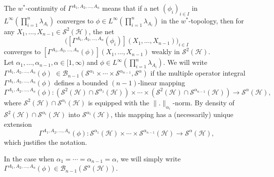 \documentclass[12pt]{amsart}
\theoremstyle{remark}
\begin{document}
The $w^*$-continuity of $\Gamma^{A_1,A_2, \ldots, A_n}$ means that if a net $(\phi_i)_{i\in I}$ in $L^{\infty}\left(\prod_{i=1}^n
\lambda_{A_i}\right)$ converges to $\phi \in L^{\infty}\left(\prod_{i=1}^n \lambda_{A_i}\right)$ in the $w^*$-topology, then for any $X_1, \ldots, X_{n-1} \in \mathcal{S}^2(\mathcal{H})$, the net
$$
\bigl(\left[\Gamma^{A_1,A_2, \ldots, A_n}(\phi_i)\right](X_1,\ldots, X_{n-1})\bigr)_{i\in I}
$$
converges to $\left[\Gamma^{A_1,A_2, \ldots, A_n}(\phi)\right](X_1,\ldots, X_{n-1})$ weakly in $\mathcal{S}^2(\mathcal{H})$.\\

Let $\alpha_1, \ldots, \alpha_{n-1}, \alpha \in [1, \infty)$ and $\phi \in L^{\infty}\left(\prod_{i=1}^n\lambda_{A_i}\right)$. We will write $\Gamma^{A_1,A_2, \ldots, A_n}(\phi)$ $\in \mathcal{B}_{n-1}(\mathcal{S}^{\alpha_1} \times \cdots \times \mathcal{S}^{\alpha_{n-1}}, \mathcal{S}^{\alpha})$
if the multiple operator integral $\Gamma^{A_1,A_2, \ldots, A_n}(\phi)$ defines a bounded $(n-1)$-linear mapping
$$
\Gamma^{A_1,A_2, \ldots, A_n}(\phi) : \left( \mathcal{S}^2(\mathcal{H}) \cap \mathcal{S}^{\alpha_1}(\mathcal{H}) \right) \times \cdots \times \left( \mathcal{S}^2(\mathcal{H}) \cap \mathcal{S}^{\alpha_{n-1}}(\mathcal{H}) \right) \rightarrow \mathcal{S}^{\alpha}(\mathcal{H}),
$$
where $\mathcal{S}^2(\mathcal{H}) \cap \mathcal{S}^{\alpha_i}(\mathcal{H})$ is equipped with the $\|.\|_{\alpha_i}$-norm. By density of $\mathcal{S}^2(\mathcal{H}) \cap \mathcal{S}^{\alpha_i}(\mathcal{H})$ into $\mathcal{S}^{\alpha_i}(\mathcal{H})$, this mapping has a (necessarily) unique extension
$$
\Gamma^{A_1,A_2, \ldots, A_n}(\phi) : \mathcal{S}^{\alpha_1}(\mathcal{H}) \times \cdots \times \mathcal{S}^{\alpha_{n-1}}(\mathcal{H}) \rightarrow \mathcal{S}^{\alpha}(\mathcal{H}),
$$
which justifies the notation.

In the case when $\alpha_1 = \cdots= \alpha_{n-1} = \alpha$, we will simply write $\Gamma^{A_1,A_2, \ldots, A_n}(\phi) \in \mathcal{B}_{n-1}(\mathcal{S}^{\alpha}(\mathcal{H}))$.
\end{document}
